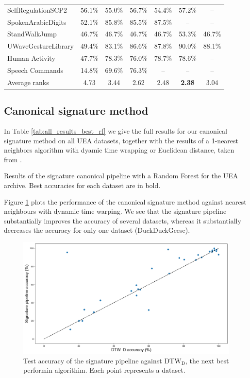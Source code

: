 \documentclass{article}
\theoremstyle{definition}
\theoremstyle{remark}
\begin{document}
\begin{table}[h]
\begin{tabular}{lcccccc}
	SelfRegulationSCP2 & 56.1\% & 55.0\% & 56.7\% & 54.4\% & 57.2\% & -- \\
	SpokenArabicDigits & 52.1\% & 85.8\% & 85.5\% & 87.5\% & -- & -- \\
	StandWalkJump & 46.7\% & 46.7\% & 46.7\% & 46.7\% & 53.3\% & 46.7\% \\
	UWaveGestureLibrary & 49.4\% & 83.1\% & 86.6\% & 87.8\% & 90.0\% & 88.1\% \\
	Human Activity & 47.7\% & 78.3\% & 76.0\% & 78.7\% & 78.6\% & -- \\
	Speech Commands & 14.8\% & 69.6\% & 76.3\% & -- & -- & -- \\
	\midrule
	Average ranks & 4.73 & 3.44 & 2.62 & 2.48 & \textbf{2.38} & 3.04 \\
	\bottomrule
	\end{tabular}
	\end{table}


	\subsection{Canonical signature method}
	In Table \ref{tab:all_results_best_rf} we give the full results for our canonical signature method on all UEA datasets, together with the results of a 1-nearest neighbors algorithm with dyamic time wrapping or Euclidean distance, taken from \citet{bagnall2018uea}.

	\begin{table}[h]
	\small
	\centering
	\caption{Results of the signature canonical pipeline with a Random Forest for the UEA archive. Best accuracies for each dataset are in bold.}
	\label{tab:all_results_best_rf}
	
	\end{table}
	
	Figure \ref{fig:dtw_against_sig} plots the performance of the canonical signature method against nearest neighbours with dynamic time warping. We see that the signature pipeline substantially improves the accuracy of several datasets, whereas it substantially decreases the accuracy for only one dataset (DuckDuckGeese).

	\begin{figure}[h]
  		\centering
  		\includegraphics[width=\linewidth]{./images/sig_vs_nextbest.png}
  		\caption{Test accuracy of the signature pipeline against DTW$_\text{D}$, the next best performin algorithim. Each point represents a dataset.}
  		\label{fig:dtw_against_sig}
	\end{figure}
\end{document}
